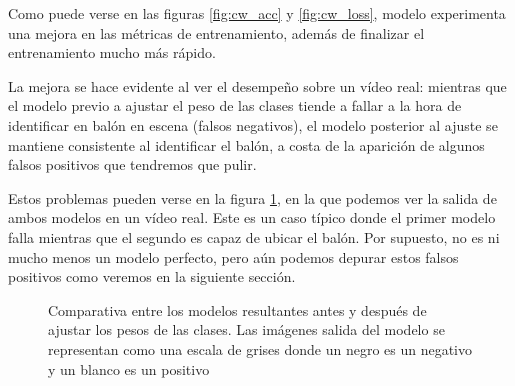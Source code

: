 Como puede verse en las figuras \ref{fig:cw_acc} y \ref{fig:cw_loss}, modelo experimenta una mejora en las métricas de entrenamiento, además de finalizar el entrenamiento mucho más rápido.

La mejora se hace evidente al ver el desempeño sobre un vídeo real: mientras que el modelo previo a ajustar el peso de las clases tiende a fallar a la hora de identificar en balón en escena (falsos negativos), el modelo posterior al ajuste se mantiene consistente al identificar el balón, a costa de la aparición de algunos falsos positivos que tendremos que pulir.

Estos problemas pueden verse en la figura \ref{fig:vidcw}, en la que podemos ver la salida de ambos modelos en un vídeo real. Este es un caso típico donde el primer modelo falla mientras que el segundo es capaz de ubicar el balón. Por supuesto, no es ni mucho menos un modelo perfecto, pero aún podemos depurar estos falsos positivos como veremos en la siguiente sección.

\begin{figure}\centering
  \par
  \hfill
  \caption{Comparativa entre los modelos resultantes antes y después de ajustar los pesos de las clases. Las imágenes salida del modelo se representan como una escala de grises donde un negro es un negativo y un blanco es un positivo}
  \label{fig:vidcw}
\end{figure}

